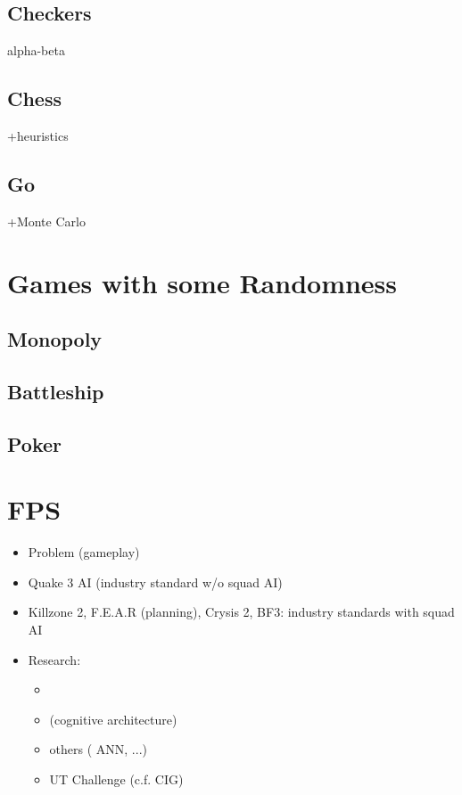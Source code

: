 \subsection{Checkers}
alpha-beta
\subsection{Chess}
+heuristics
\subsection{Go}
+Monte Carlo

\section{Games with some Randomness}
\subsection{Monopoly}
\subsection{Battleship}
\subsection{Poker}

\citep{gunn}

\section{FPS}
\begin{itemize}
\item Problem (gameplay)
\item Quake 3 AI (industry standard w/o squad AI) \citep{waveren-02-artificial}
\item Killzone 2, F.E.A.R \citep{orkinGDC_FEAR} (planning), Crysis 2, BF3: industry standards with squad AI
\item Research:
\begin{itemize}
\item \citep{lehy04}
\item \citep{Laird01} (cognitive architecture)
\item others (\citep{Hladky_anevaluation} ANN, ...)
\item UT Challenge (c.f. CIG)
\end{itemize}
\end{itemize}

